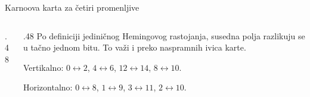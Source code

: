 \begin{frame}[label=02-s036]{Karnoova karta za četiri promenljive}
\setlength{\parskip}{0pt}
\begin{columns}[c,onlytextwidth]
\begin{column}{.48\textwidth}\centering

\end{column}
\begin{column}{.48\textwidth}
Po definiciji jediničnog Hemingovog rastojanja, susedna polja razlikuju se u tačno jednom bitu. To važi i preko naspramnih ivica karte.
\par\vspace{3mm}
\par\vspace{1mm}
Vertikalno: \(0\leftrightarrow2\), \(4\leftrightarrow6\), \(12\leftrightarrow14\), \(8\leftrightarrow10\).
\par\vspace{2mm}
Horizontalno: \(0\leftrightarrow8\), \(1\leftrightarrow9\), \(3\leftrightarrow11\), \(2\leftrightarrow10\).
\end{column}
\end{columns}
\end{frame}
